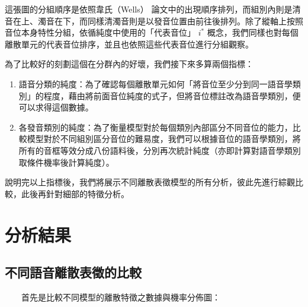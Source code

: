 {        這張圖的分組順序是依照韋氏（Wells） \cite{wells_phonetic_2022} 論文中的出現順序排列，而組別內則是清音在上、濁音在下，而同樣清濁音則是以發音位置由前往後排列。除了縱軸上按照音位本身特性分組，依循純度中使用的「代表音位」 $i^\ast$ 概念，我們同樣也對每個離散單元的代表音位排序，並且也依照這些代表音位進行分組觀察。

        為了比較好的刻劃這個在分群內的好壞，我們接下來多算兩個指標：\par
\begin{enumerate}
    \item 語音分類的純度：為了確認每個離散單元如何「將音位至少分到同一語音學類別」的程度，藉由將前面音位純度的式子，但將音位標註改為語音學類別，便可以求得這個數據。
    \item 各發音類別的純度：為了衡量模型對於每個類別內部區分不同音位的能力，比較模型對於不同組別區分音位的難易度，我們可以根據音位的語音學類別，將所有的音框等效分成八份語料後，分別再次統計純度（亦即計算對語音學類別取條件機率後計算純度）。
\end{enumerate}

        說明完以上指標後，我們將展示不同離散表徵模型的所有分析，彼此先進行綜觀比較，此後再針對細部的特徵分析。


}
\section{分析結果}

\subsection{不同語音離散表徵的比較}

　　首先是比較不同模型的離散特徵之數據與機率分佈圖：

